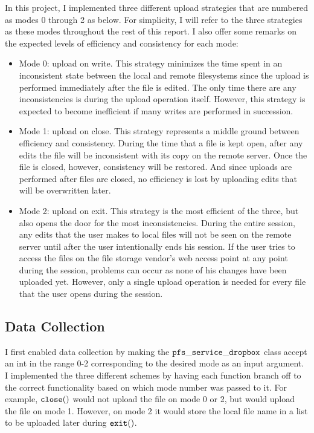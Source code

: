 \documentclass[pageno]{jpaper}
\begin{document}
In this project, I implemented three different upload strategies that are numbered as modes 0 through 2 as below. For simplicity, I will refer to the three strategies as these modes throughout the rest of this report. I also offer some remarks on the expected levels of efficiency and consistency for each mode:
\begin{itemize}
	\item Mode 0: upload on write. This strategy minimizes the time spent in an inconsistent state between the local and remote filesystems since the upload is performed immediately after the file is edited. The only time there are any inconsistencies is during the upload operation itself. However, this strategy is expected to become inefficient if many writes are performed in succession.
	\item Mode 1: upload on close. This strategy represents a middle ground between efficiency and consistency. During the time that a file is kept open, after any edits the file will be inconsistent with its copy on the remote server. Once the file is closed, however, consistency will be restored. And since uploads are performed after files are closed, no efficiency is lost by uploading edits that will be overwritten later.
	\item Mode 2: upload on exit. This strategy is the most efficient of the three, but also opens the door for the most inconsistencies. During the entire session, any edits that the user makes to local files will not be seen on the remote server until after the user intentionally ends his session. If the user tries to access the files on the file storage vendor's web access point at any point during the session, problems can occur as none of his changes have been uploaded yet. However, only a single upload operation is needed for every file that the user opens during the session.
\end{itemize}

\subsection{Data Collection}
I first enabled data collection by making the $\tt{pfs\_service\_dropbox}$ class accept an int in the range 0-2 corresponding to the desired mode as an input argument. I implemented the three different schemes by having each function branch off to the correct functionality based on which mode number was passed to it. For example, $\tt{close()}$ would not upload the file on mode 0 or 2, but would upload the file on mode 1. However, on mode 2 it would store the local file name in a list to be uploaded later during $\tt{exit()}$.
\end{document}

